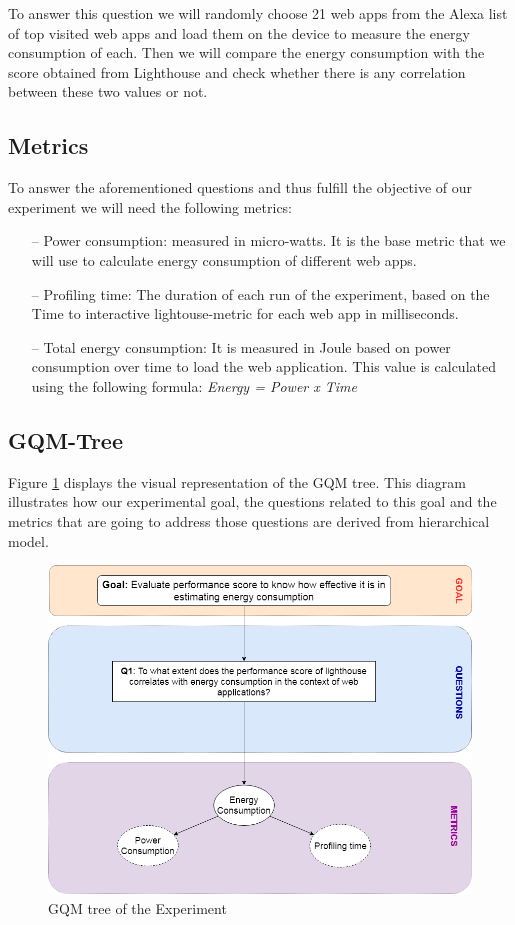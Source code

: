 To answer this question we will randomly choose 21 web apps from the Alexa list of top visited web apps and load them on the device to measure the energy consumption of each\cite{Web:Alexa}. Then we will compare the energy consumption with the score obtained from Lighthouse and check whether there is any correlation between these two values or not.
\newline

\subsection{Metrics}

To answer the aforementioned questions and thus fulfill the objective of our experiment we will need the following metrics:
\newline

\begin{itemize}
	\item[--] Power consumption: measured in micro-watts.  It is the base metric that we will use to calculate energy consumption of different web apps.
   \item[--] Profiling time: The duration of each run of the experiment, based on the Time to interactive lightouse-metric for each web app in milliseconds.
   	\item[--] Total energy consumption: It is measured in Joule based on power consumption over time to load the web application. This value is calculated using the following formula:
   	 \textit{Energy = Power x Time}   
   	 \newline
\end{itemize}


\subsection{GQM-Tree}

Figure \ref{fig:GQM} displays the visual representation of the GQM tree. This diagram illustrates how our experimental goal, the questions related to this goal and the metrics that are going to address those questions are derived from hierarchical model.
\newline

\begin{figure}[H]
  \includegraphics[width=\linewidth]{./Images/GQM.png}
  \caption{GQM tree of the Experiment}
  \label{fig:GQM}
\end{figure}
\newpage


